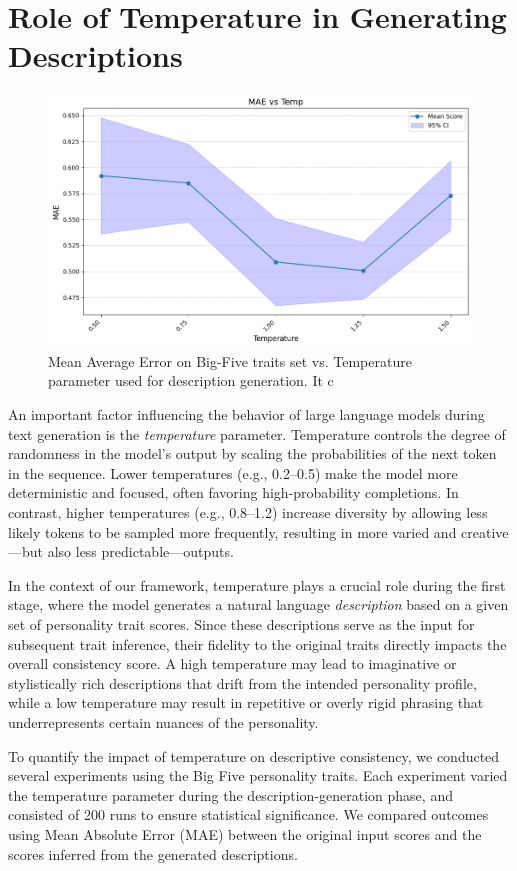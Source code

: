 \documentclass[12pt]{article}
\begin{document}
\section{Role of Temperature in Generating Descriptions}
\begin{figure}[h]
    \centering
    \includegraphics[width=0.9\linewidth]{temp_dependency.png}
    \caption{Mean Average Error on Big-Five traits set vs. Temperature parameter used for description generation. It c}
    \label{fig:enter-label}
\end{figure}
An important factor influencing the behavior of large language models during text generation is the \textit{temperature} parameter. Temperature controls the degree of randomness in the model’s output by scaling the probabilities of the next token in the sequence. Lower temperatures (e.g., 0.2–0.5) make the model more deterministic and focused, often favoring high-probability completions. In contrast, higher temperatures (e.g., 0.8–1.2) increase diversity by allowing less likely tokens to be sampled more frequently, resulting in more varied and creative—but also less predictable—outputs.

In the context of our framework, temperature plays a crucial role during the first stage, where the model generates a natural language \textit{description} based on a given set of personality trait scores. Since these descriptions serve as the input for subsequent trait inference, their fidelity to the original traits directly impacts the overall consistency score. A high temperature may lead to imaginative or stylistically rich descriptions that drift from the intended personality profile, while a low temperature may result in repetitive or overly rigid phrasing that underrepresents certain nuances of the personality.

To quantify the impact of temperature on descriptive consistency, we conducted several experiments using the Big Five personality traits. Each experiment varied the temperature parameter during the description-generation phase, and consisted of 200 runs to ensure statistical significance. We compared outcomes using Mean Absolute Error (MAE) between the original input scores and the scores inferred from the generated descriptions.
\end{document}
